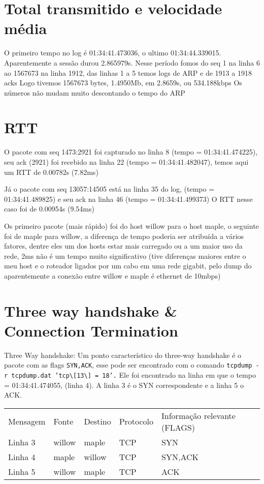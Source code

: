 \documentclass[11pt]{article}
\begin{document}
\section{Total transmitido e velocidade média}
\label{sec-5}
O primeiro tempo no log é 01:34:41.473036, o ultimo 01:34:44.339015.
Aparentemente a sessão durou 2.865979s.
Nesse período fomos do seq 1 na linha 6 ao 1567673 na linha 1912,
das linhas 1 a 5 temos logs de ARP e de 1913 a 1918 acks
Logo tivemos 1567673 bytes, 1.4950Mb,  em 2.8659s, ou 534.188kbps
Os números não mudam muito descontando o tempo do ARP

\section{RTT}
\label{sec-6}
O pacote com seq 1473:2921 foi capturado no linha 8 (tempo = 01:34:41.474225), 
seu ack (2921) foi recebido na linha 22 (tempo = 01:34:41.482047), temos aqui 
um RTT de 0.00782s (7.82ms)

Já o pacote com seq 13057:14505 está na linha 35 do log,
(tempo = 01:34:41.489825) e seu ack na linha 46 (tempo = 01:34:41.499373)
O RTT nesse caso foi de 0.00954s (9.54ms)

Os primeiro pacote (mais rápido) foi do host willow para o host maple, o
seguinte foi de maple para willow, a diferença de tempo poderia ser atribuída a
vários fatores, dentre eles um dos hosts estar mais carregado ou a um maior uso
da rede, 2ms não é um tempo muito significativo (tive diferenças maiores entre
o meu host e o roteador ligados por um cabo em uma rede gigabit, pelo dump do
aparentemente a conexão entre willow e maple é ethernet de 10mbps)

\section{Three way handshake \& Connection Termination}
\label{sec-7}
Three Way handshake:
Um ponto característico do three-way handshake é o pacote com as flags
\texttt{SYN,ACK}, esse pode ser encontrado com o comando
\texttt{tcpdump -r tcpdump.dat 'tcp\textbackslash{}[13\textbackslash{}] = 18'.}
Ele foi encontrado na linha em que o tempo = 01:34:41.474055, (linha 4).
A linha 3 é o SYN correspondente e a linha 5 o ACK.
\begin{center}
\begin{tabular}{lllll}
Mensagem & Fonte & Destino & Protocolo & Informação relevante (FLAGS)\\
Linha 3 & willow & maple & TCP & SYN\\
Linha 4 & maple & willow & TCP & SYN,ACK\\
Linha 5 & willow & maple & TCP & ACK\\
\end{tabular}
\end{center}
\end{document}
